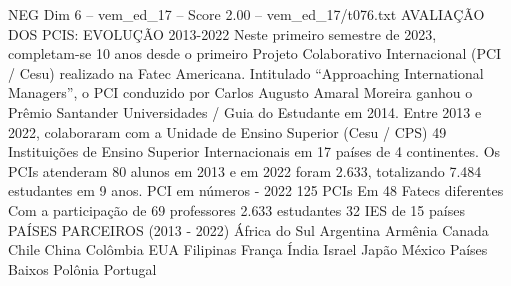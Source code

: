 \begin{textsample}{NEG Dim 6 – vem\_ed\_17 – Score 2.00 – vem\_ed\_17/t076.txt}  \label{ex:f6_neg_121}
AVALIAÇÃO DOS PCIS: EVOLUÇÃO 2013-2022 Neste primeiro semestre de 2023, completam-se 10 anos desde o primeiro Projeto Colaborativo Internacional (PCI / Cesu) realizado na Fatec Americana.
Intitulado “Approaching International Managers”, o PCI conduzido por Carlos Augusto Amaral Moreira ganhou o Prêmio Santander Universidades / Guia do Estudante em 2014.
Entre 2013 e 2022, colaboraram com a Unidade de Ensino Superior (Cesu / CPS) 49 Instituições de Ensino Superior Internacionais em 17 países de 4 continentes.
Os PCIs atenderam 80 alunos em 2013 e em 2022 foram 2.633, totalizando 7.484 estudantes em 9 anos.
PCI em números - 2022 125 PCIs Em 48 Fatecs diferentes Com a participação de 69 professores 2.633 estudantes 32 IES de 15 países PAÍSES PARCEIROS (2013 - 2022) África do Sul Argentina Armênia Canada Chile China Colômbia EUA Filipinas França Índia Israel Japão México Países Baixos Polônia Portugal

\end{textsample}
